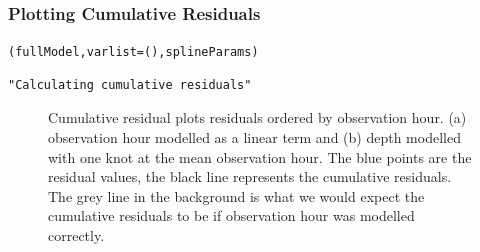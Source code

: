 \begin{frame}[fragile]
\frametitle{Plotting Cumulative Residuals}
\begin{knitrout}\footnotesize
{}\color{fgcolor}\begin{kframe}
\begin{alltt}
(fullModel, varlist= (), splineParams)
\end{alltt}
\begin{verbatim}
"Calculating cumulative residuals"
\end{verbatim}
\end{kframe}
\end{knitrout}

\begin{figure}[h]
  \centering
  \hfill
\caption{Cumulative residual plots residuals ordered by observation hour. (a) observation hour modelled as a linear term and (b) depth modelled with one knot at the mean observation hour.  The blue points are the residual values, the black line represents the cumulative residuals. The grey line in the background is what we would expect the cumulative residuals to be if observation hour was modelled correctly.}
\label{fig:nscumres1}
\end{figure}
\end{frame}

